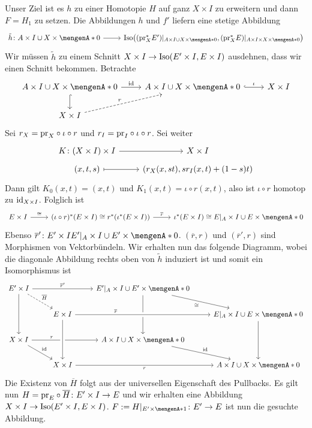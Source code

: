 \begin{beweis}
Unser Ziel ist es $h$ zu einer Homotopie $H$ auf ganz $X \times I$ zu erweitern und dann $F = H_1$ zu setzen.
Die Abbildungen $h$ und $f'$ liefern eine stetige Abbildung 
\[
	\begin{tikzcd}
		\tilde{h} \colon A \times I \cup X \times \set{0} \rar & \Iso \enbrace*{\enbrace*{\pr_X^* E'}|_{A \times I \cup X \times \set{0} },\enbrace*{\pr_X^* E}|_{A \times I \times X \times 
		\set{0}}} 
	\end{tikzcd}
\]
Wir müssen $\tilde{h}$ zu einem Schnitt $X \times I \to \operatorname{Iso}(E'\times I, E \times I)$ ausdehnen, dass wir einen Schnitt bekommen. Betrachte 
\[
	\begin{tikzcd}
		A \times I \cup X \times \set{0} \rar["\id"] \dar[hook]& A \times I \cup X \times \set{0} \rar["\iota",hook] & X \times I\\  
		X \times I \urar[dashed,"r"]
	\end{tikzcd}
\]
Sei $r_X = \mathrm{pr}_X \circ \iota \circ r$ und $r_I = \mathrm{pr}_I \circ \iota \circ r$. Sei weiter 
\[
	\begin{tikzcd}[row sep=tiny]
		K \colon (X \times I) \times I \rar &  X \times I \\
		(x,t,s) \rar[mapsto] & \enbrace*{r_X(x,st), s r_I(x,t) + (1-s)t} 
	\end{tikzcd}
\]
Dann gilt $K_0(x,t)=(x,t)$ und $K_1(x,t)= \iota \circ r(x,t)$, also ist $\iota \circ r$ homotop zu $\operatorname{id}_{X \times I}$. Folglich ist
\[
	\begin{tikzcd}
		E \times I \rar["\cong"] &(\iota \circ r)^*(E \times I) \cong r^* \enbrace*{\iota^*(E \times I)} \rar["\overline{r}"] & \iota^*(E \times I) \cong E|_A \times I \cup E 
		\times \set{0} 
	\end{tikzcd}
\]
Ebenso $\overline{r}' \colon E' \times I E'|_A \times I \cup E' \times \set{0}$. $(\overline{r},r)$ und $(\overline{r}',r)$ sind Morphismen von Vektorbündeln.
Wir erhalten nun das folgende Diagramm, wobei die diagonale Abbildung rechts oben von $\tilde{h}$ induziert ist und somit ein Isomorphismus ist
\[
	\begin{tikzcd}[] %
		E' \times I \ar[dd] \ar[rr,"\overline{r}'"] \ar[dr,"\overline{H}",dashed]& & E'|_A \times I \cup E' \times \set{0} \ar[dd] \drar["\cong"'] \\
		& E \times I \ar[rr,"\overline{r}", crossing over,pos=0.3] & & E|_A \times I \cup E \times \set{0} \ar[dd] \\
		X \times I \ar[rr,"r",pos=0.3] \ar[dr,"\id"] & & A \times I \cup X \times \set{0} \ar[dr,"\id"] \\
		& X \times I \ar[from=uu,crossing over] \ar[rr,"r"']& & A \times I \cup X \times \set{0} 
	\end{tikzcd}
\]
Die Existenz von $\overline{H}$ folgt aus der universellen Eigenschaft des Pullbacks. Es gilt nun $H=\mathrm{pr}_E \circ \overline{H} \colon E' \times I \to E$ und wir erhalten
eine Abbildung $X \times I \to \operatorname{Iso}(E' \times I, E \times I)$. $F := H|_{E' \times \set{1}} \colon E' \to E$ ist nun die gesuchte Abbildung.
\end{beweis}

